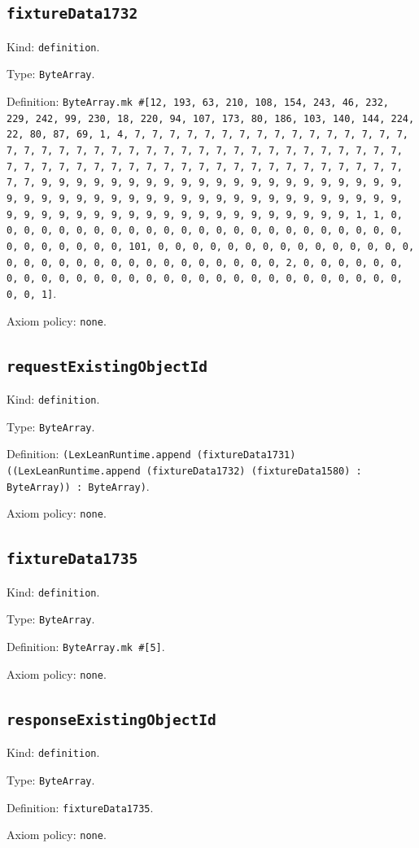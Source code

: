 \documentclass[11pt]{article}
\begin{document}
\subsection*{\texttt{fixtureData1732}}
\noindent Kind: \texttt{definition}.\par
\noindent Type: \texttt{ByteArray}.\par
\noindent Definition: \texttt{ByteArray.mk \#[12, 193, 63, 210, 108, 154, 243, 46, 232, 229, 242, 99, 230, 18, 220, 94, 107, 173, 80, 186, 103, 140, 144, 224, 22, 80, 87, 69, 1, 4, 7, 7, 7, 7, 7, 7, 7, 7, 7, 7, 7, 7, 7, 7, 7, 7, 7, 7, 7, 7, 7, 7, 7, 7, 7, 7, 7, 7, 7, 7, 7, 7, 7, 7, 7, 7, 7, 7, 7, 7, 7, 7, 7, 7, 7, 7, 7, 7, 7, 7, 7, 7, 7, 7, 7, 7, 7, 7, 7, 7, 7, 7, 7, 7, 9, 9, 9, 9, 9, 9, 9, 9, 9, 9, 9, 9, 9, 9, 9, 9, 9, 9, 9, 9, 9, 9, 9, 9, 9, 9, 9, 9, 9, 9, 9, 9, 9, 9, 9, 9, 9, 9, 9, 9, 9, 9, 9, 9, 9, 9, 9, 9, 9, 9, 9, 9, 9, 9, 9, 9, 9, 9, 9, 9, 9, 9, 9, 9, 1, 1, 0, 0, 0, 0, 0, 0, 0, 0, 0, 0, 0, 0, 0, 0, 0, 0, 0, 0, 0, 0, 0, 0, 0, 0, 0, 0, 0, 0, 0, 0, 0, 101, 0, 0, 0, 0, 0, 0, 0, 0, 0, 0, 0, 0, 0, 0, 0, 0, 0, 0, 0, 0, 0, 0, 0, 0, 0, 0, 0, 0, 0, 0, 0, 2, 0, 0, 0, 0, 0, 0, 0, 0, 0, 0, 0, 0, 0, 0, 0, 0, 0, 0, 0, 0, 0, 0, 0, 0, 0, 0, 0, 0, 0, 0, 0, 1]}.\par
\noindent Axiom policy: \texttt{none}.\par
\subsection*{\texttt{requestExistingObjectId}}
\noindent Kind: \texttt{definition}.\par
\noindent Type: \texttt{ByteArray}.\par
\noindent Definition: \texttt{(LexLeanRuntime.append (fixtureData1731) ((LexLeanRuntime.append (fixtureData1732) (fixtureData1580) : ByteArray)) : ByteArray)}.\par
\noindent Axiom policy: \texttt{none}.\par
\subsection*{\texttt{fixtureData1735}}
\noindent Kind: \texttt{definition}.\par
\noindent Type: \texttt{ByteArray}.\par
\noindent Definition: \texttt{ByteArray.mk \#[5]}.\par
\noindent Axiom policy: \texttt{none}.\par
\subsection*{\texttt{responseExistingObjectId}}
\noindent Kind: \texttt{definition}.\par
\noindent Type: \texttt{ByteArray}.\par
\noindent Definition: \texttt{fixtureData1735}.\par
\noindent Axiom policy: \texttt{none}.\par
\end{document}
